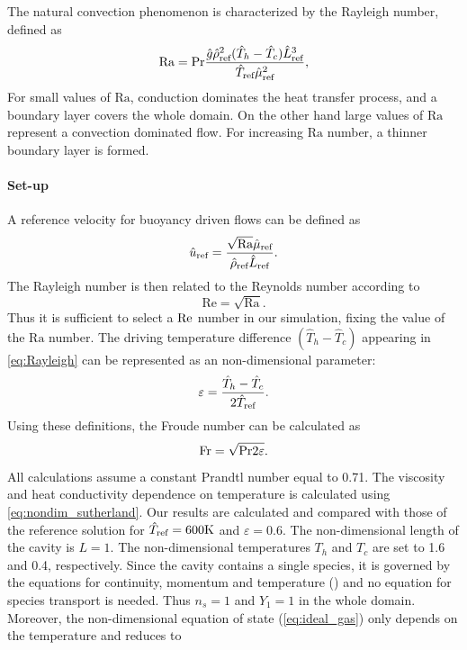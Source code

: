 The natural convection phenomenon is characterized by the Rayleigh number, defined as
\begin{equation}\label{eq:Rayleigh}
	\text{Ra} = \Prandtl \frac{\hat g \RefVal{\rho}^2(\hat T_h-\hat T_c) \RefVal{L}^3}{\RefVal{T}\RefVal{\mu}^2},
\end{equation}
For small values of $\text{Ra}$, conduction dominates the heat transfer process, and a boundary layer covers the whole domain. On the other hand large values of $\text{Ra}$ represent a convection dominated flow. For increasing $\text{Ra}$ number, a thinner boundary layer is formed.

\paragraph{Set-up}
A reference velocity for buoyancy driven flows can be defined as\cite{vierendeelsBenchmarkSolutionsNatural2003}
\begin{equation}
	\RefVal{u} = \frac{\sqrt{\text{Ra}} \RefVal{\mu}}{\RefVal{\rho}\RefVal{L}}.
\end{equation}
The Rayleigh number is then related to the Reynolds number according to
\begin{equation}
	\text{Re} = \sqrt{\text{Ra}}.
\end{equation}
Thus it is sufficient to select a $\Reynolds$ number in our simulation, fixing the value of the $\text{Ra}$ number. The driving temperature difference $(\hat T_h - \hat T_c)$ appearing in \cref{eq:Rayleigh} can be represented as an non-dimensional parameter:
\begin{equation}\label{eq:nondimensionalTemperature}
	\varepsilon = \frac{\hat T_h - \hat T_c}{2\RefVal{T}}.
\end{equation}
Using these definitions, the Froude number can be calculated as
\begin{equation}
	\Froude = \sqrt{\Prandtl 2 \varepsilon}.
\end{equation}
All calculations assume a constant Prandtl number equal to 0.71. The viscosity and heat conductivity  dependence on temperature is calculated using \cref{eq:nondim_sutherland}.
Our results are calculated and compared with those of the reference solution for $\RefVal{T} = 600\si{K}$  and $\varepsilon = 0.6$. The non-dimensional length of the cavity is $L=1$. The non-dimensional temperatures $T_h$ and $T_c$ are set to 1.6 and 0.4, respectively.
Since the cavity contains a single species, it is governed by the equations for continuity, momentum and temperature () and no equation for species transport is needed. Thus $n_s = 1$ and  $Y_1 = 1$ in the whole domain.  Moreover, the non-dimensional equation of state (\cref{eq:ideal_gas}) only depends on the temperature and reduces to
